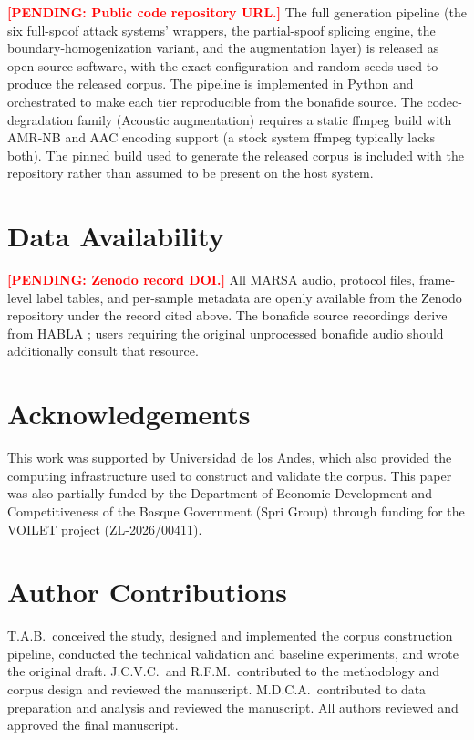 \documentclass[11pt]{article}
\newcommand{\PENDING}[1]{\textcolor{red}{\textbf{[PENDING: #1]}}}
\begin{document}
\PENDING{Public code repository URL.} The full generation pipeline (the
six full-spoof attack systems' wrappers, the partial-spoof splicing
engine, the boundary-homogenization variant, and the augmentation
layer) is released as open-source software, with the exact configuration
and random seeds used to produce the released corpus. The pipeline is
implemented in Python and orchestrated to make each tier reproducible
from the bonafide source. The codec-degradation family (Acoustic
augmentation) requires a static ffmpeg build with AMR-NB and AAC
encoding support (a stock system ffmpeg typically lacks both). The
pinned build used to generate the released corpus is included with the
repository rather than assumed to be present on the host system.

\FloatBarrier
\section*{Data Availability}

\PENDING{Zenodo record DOI.} All MARSA audio, protocol files, frame-level
label tables, and per-sample metadata are openly available from the
Zenodo repository under the record cited above. The bonafide source
recordings derive from HABLA \citep{habla}; users requiring the original
unprocessed bonafide audio should additionally consult that resource.

\FloatBarrier
\section*{Acknowledgements}
This work was supported by Universidad de los Andes, which also
provided the computing infrastructure used to construct and validate
the corpus. This paper was also partially funded by the Department of Economic Development and Competitiveness of the Basque Government (Spri Group) through funding for the VOILET project (ZL-2026/00411).

\FloatBarrier
\section*{Author Contributions}
T.A.B.\ conceived the study, designed and implemented the corpus
construction pipeline, conducted the technical validation and baseline
experiments, and wrote the original draft. J.C.V.C.\ and R.F.M.\
contributed to the methodology and corpus design and reviewed the
manuscript. M.D.C.A.\ contributed to data preparation and analysis and
reviewed the manuscript. All authors reviewed and approved the final
manuscript.
\end{document}
